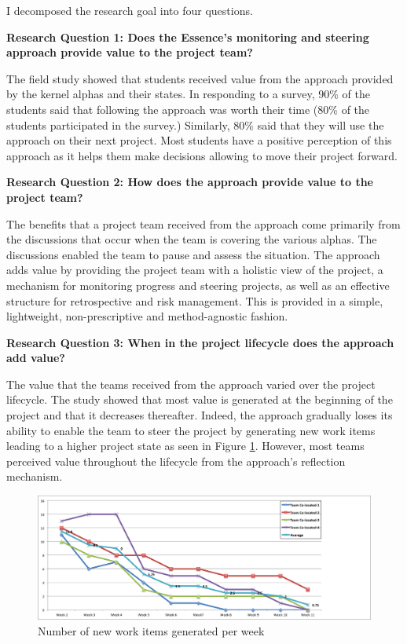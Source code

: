 \documentclass[preprint,12pt,3p]{elsarticle}
\begin{document}
I decomposed the research goal into four questions.

\textbf{Research Question 1: Does the Essence's monitoring and steering approach provide value to the project team?}

The field study showed that students received value from the approach provided by the kernel alphas and their states. In responding to a survey, 90\% of the students said that following the approach was worth their time (80\% of the students participated in the survey.) Similarly, 80\% said that they will use the approach on their next project. Most students have a positive perception of this approach as it helps them make decisions allowing to move their project forward. 

\textbf{Research Question 2: How does the approach provide value to the project team?}

The benefits that a project team received from the approach come primarily from the discussions that occur when the team is covering the various alphas. The discussions enabled the team to pause and assess the situation. The approach adds value by providing the project team with a holistic view of the project, a mechanism for monitoring progress and steering projects, as well as an effective structure for retrospective and risk management. This is provided in a simple, lightweight, non-prescriptive and method-agnostic fashion.

\textbf{Research Question 3: When in the project lifecycle does the approach add value?}

The value that the teams received from the approach varied over the project lifecycle. The study showed that most value is generated at the beginning of the project and that it decreases thereafter. Indeed, the approach gradually loses its ability to enable the team to steer the project by generating new work items leading to a higher project state as seen in Figure \ref{WorkItems}. However, most teams perceived value throughout the lifecycle from the approach's reflection mechanism.

\begin{figure}[h]\vspace*{4pt}
\centerline{\includegraphics[width=5.4in]{field_study_images/WorkItems}}
\caption{Number of new work items generated per week}\vspace*{-6pt}\label{WorkItems}
\end{figure}
\end{document}
